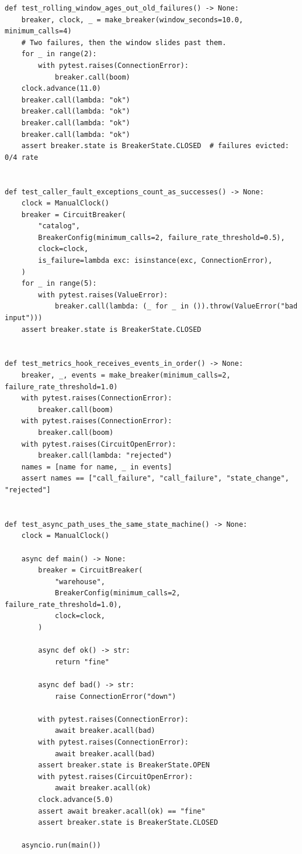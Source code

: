 \begin{verbatim}
def test_rolling_window_ages_out_old_failures() -> None:
    breaker, clock, _ = make_breaker(window_seconds=10.0, minimum_calls=4)
    # Two failures, then the window slides past them.
    for _ in range(2):
        with pytest.raises(ConnectionError):
            breaker.call(boom)
    clock.advance(11.0)
    breaker.call(lambda: "ok")
    breaker.call(lambda: "ok")
    breaker.call(lambda: "ok")
    breaker.call(lambda: "ok")
    assert breaker.state is BreakerState.CLOSED  # failures evicted: 0/4 rate


def test_caller_fault_exceptions_count_as_successes() -> None:
    clock = ManualClock()
    breaker = CircuitBreaker(
        "catalog",
        BreakerConfig(minimum_calls=2, failure_rate_threshold=0.5),
        clock=clock,
        is_failure=lambda exc: isinstance(exc, ConnectionError),
    )
    for _ in range(5):
        with pytest.raises(ValueError):
            breaker.call(lambda: (_ for _ in ()).throw(ValueError("bad input")))
    assert breaker.state is BreakerState.CLOSED


def test_metrics_hook_receives_events_in_order() -> None:
    breaker, _, events = make_breaker(minimum_calls=2, failure_rate_threshold=1.0)
    with pytest.raises(ConnectionError):
        breaker.call(boom)
    with pytest.raises(ConnectionError):
        breaker.call(boom)
    with pytest.raises(CircuitOpenError):
        breaker.call(lambda: "rejected")
    names = [name for name, _ in events]
    assert names == ["call_failure", "call_failure", "state_change", "rejected"]


def test_async_path_uses_the_same_state_machine() -> None:
    clock = ManualClock()

    async def main() -> None:
        breaker = CircuitBreaker(
            "warehouse",
            BreakerConfig(minimum_calls=2, failure_rate_threshold=1.0),
            clock=clock,
        )

        async def ok() -> str:
            return "fine"

        async def bad() -> str:
            raise ConnectionError("down")

        with pytest.raises(ConnectionError):
            await breaker.acall(bad)
        with pytest.raises(ConnectionError):
            await breaker.acall(bad)
        assert breaker.state is BreakerState.OPEN
        with pytest.raises(CircuitOpenError):
            await breaker.acall(ok)
        clock.advance(5.0)
        assert await breaker.acall(ok) == "fine"
        assert breaker.state is BreakerState.CLOSED

    asyncio.run(main())
\end{verbatim}


